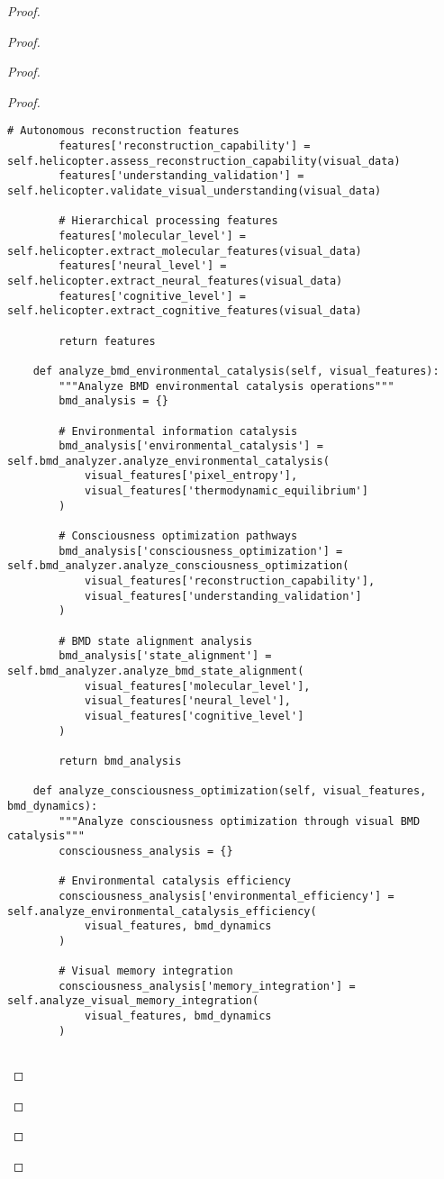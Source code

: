 \documentclass[12pt,a4paper]{article}
\begin{document}
\begin{proof}
{\begin{proof}
\begin{proof}
\begin{proof}
\begin{lstlisting}[style=pythonstyle, caption=Visual Memory BMD Integration]
        # Autonomous reconstruction features
        features['reconstruction_capability'] = self.helicopter.assess_reconstruction_capability(visual_data)
        features['understanding_validation'] = self.helicopter.validate_visual_understanding(visual_data)
        
        # Hierarchical processing features
        features['molecular_level'] = self.helicopter.extract_molecular_features(visual_data)
        features['neural_level'] = self.helicopter.extract_neural_features(visual_data)
        features['cognitive_level'] = self.helicopter.extract_cognitive_features(visual_data)
        
        return features
    
    def analyze_bmd_environmental_catalysis(self, visual_features):
        """Analyze BMD environmental catalysis operations"""
        bmd_analysis = {}
        
        # Environmental information catalysis
        bmd_analysis['environmental_catalysis'] = self.bmd_analyzer.analyze_environmental_catalysis(
            visual_features['pixel_entropy'],
            visual_features['thermodynamic_equilibrium']
        )
        
        # Consciousness optimization pathways
        bmd_analysis['consciousness_optimization'] = self.bmd_analyzer.analyze_consciousness_optimization(
            visual_features['reconstruction_capability'],
            visual_features['understanding_validation']
        )
        
        # BMD state alignment analysis
        bmd_analysis['state_alignment'] = self.bmd_analyzer.analyze_bmd_state_alignment(
            visual_features['molecular_level'],
            visual_features['neural_level'],
            visual_features['cognitive_level']
        )
        
        return bmd_analysis
    
    def analyze_consciousness_optimization(self, visual_features, bmd_dynamics):
        """Analyze consciousness optimization through visual BMD catalysis"""
        consciousness_analysis = {}
        
        # Environmental catalysis efficiency
        consciousness_analysis['environmental_efficiency'] = self.analyze_environmental_catalysis_efficiency(
            visual_features, bmd_dynamics
        )
        
        # Visual memory integration
        consciousness_analysis['memory_integration'] = self.analyze_visual_memory_integration(
            visual_features, bmd_dynamics
        )
        

\end{lstlisting}
\end{proof}
\end{proof}
\end{proof}}
\end{proof}
\end{document}
